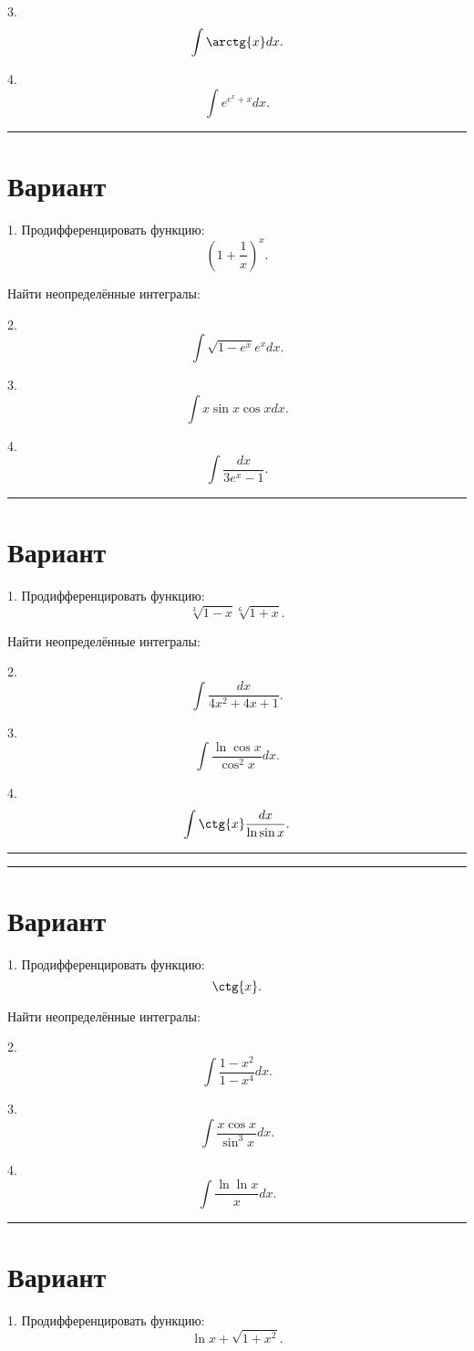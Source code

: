 \documentclass[8pt,a4paper]{scrartcl}
\newcommand{\HRule}{\rule{\linewidth}{0.1mm}}
\begin{document}
3.
\[ \int{\arctg{x} dx}. \]

4.
\[ \int{e^{e^x + x} dx}. \]

\HRule

\section{Вариант} 

1. Продифференцировать функцию:
\[ \left(1 + \frac{1}{x}\right)^x. \]

Найти неопределённые интегралы:

2. 
\[ \int{\sqrt{1 - e^x} e^x dx}. \]

3.
\[ \int{x \sin{x} \cos{x} dx}. \]

4.
\[ \int{\frac{dx}{3 e^x - 1}}. \]

\HRule

\section{Вариант} 

1. Продифференцировать функцию:
\[ \sqrt[3]{1 - x} \sqrt[6]{1 + x}. \]

Найти неопределённые интегралы:

2. 
\[ \int\frac{dx}{4 x^2 + 4 x + 1}. \]

3.
\[ \int{\frac{\ln{\cos{x}}}{\cos^2{x}} dx}. \]

4.
\[ \int{\ctg{x} \frac{dx}{\ln{\sin{x}}}}. \]

\HRule

\pagebreak

\HRule

\section{Вариант}
1. Продифференцировать функцию:
\[ \ctg{x}. \]

Найти неопределённые интегралы:

2. 
\[ \int{\frac{1 - x^2}{1 - x^4} dx}. \]

3.
\[ \int{\frac{x \cos{x}}{\sin^3{x}} dx}. \]

4.
\[ \int{\frac{\ln{\ln{x}}}{x} dx}. \]


\HRule

\section{Вариант}
1. Продифференцировать функцию:
\[ \ln{x + \sqrt{1 + x^2}}. \]
\end{document}
